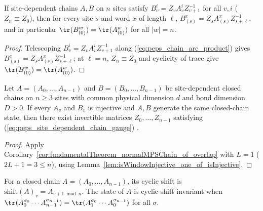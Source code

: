 \begin{lemma}%
    \label{thm:mps_chain_gaugeEquiv_sameState}
    \leanok
    If site-dependent chains $A,B$ on $n$ sites satisfy
    $B_v^i=Z_vA_v^iZ_{v+1}^{-1}$ for all $v,i$ ($Z_n\equiv Z_0$), then for every
    site $s$ and word $x$ of length $\ell$,
    $B_{(s)}^x = Z_s A_{(s)}^x Z_{s+\ell}^{-1}$, and in particular
    $\tr(B_{(0)}^w)=\tr(A_{(0)}^w)$ for all $|w|=n$.
\end{lemma}
\begin{proof}\leanok
    Telescoping $B_v^i=Z_v A_v^i Z_{v+1}^{-1}$ along (\ref{eq:peps_chain_arc_product})
    gives $B_{(s)}^x = Z_s A_{(s)}^x Z_{s+\ell}^{-1}$; at $\ell=n$,
    $Z_n\equiv Z_0$ and cyclicity of trace give $\tr(B_{(0)}^w)=\tr(A_{(0)}^w)$.
\end{proof}

\begin{corollary}%
    \label{cor:fundamentalTheorem_injectiveMPSChain_of_sameState}
    \leanok
    Let $A=(A_0,\ldots,A_{n-1})$ and $B=(B_0,\ldots,B_{n-1})$ be site-dependent
    closed chains on $n\ge 3$ sites with common physical dimension $d$ and
    bond dimension $D>0$. If every $A_v$ and $B_v$ is injective and $A,B$
    generate the same closed-chain state, then there exist invertible matrices
    $Z_0,\ldots,Z_{n-1}$ satisfying (\ref{eq:peps_site_dependent_chain_gauge})
    \cite[Theorem~\textup{thm:inj\_MPS}, lines~688--725]{Molnar2018NormalPEPS}.
\end{corollary}
\begin{proof}\leanok
    Apply Corollary~\ref{cor:fundamentalTheorem_normalMPSChain_of_overlap} with
    $L=1$ ($2L+1=3\le n$), using
    Lemma~\ref{lem:isWindowInjective_one_of_isInjective}.
\end{proof}

\begin{definition}%
    \label{def:mps_chain_cyclic_shift}
    \leanok
    For a closed chain $A=(A_0,\ldots,A_{n-1})$, its cyclic shift is
    $\mathrm{shift}(A)_v=A_{v+1\bmod n}$. The state of $A$ is cyclic-shift
    invariant when $\tr(A_0^{\sigma_0}\cdots A_{n-1}^{\sigma_{n-1}})
        =\tr(A_1^{\sigma_0}\cdots A_0^{\sigma_{n-1}})$ for all $\sigma$.
\end{definition}

